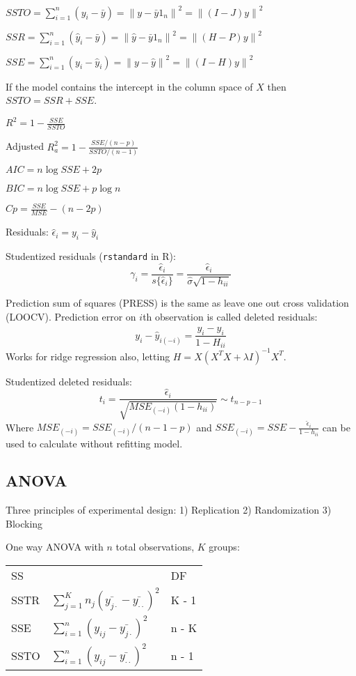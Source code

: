 \documentclass[10pt, twocolumn]{article}
\newcommand{\norm}[1]{\left\lVert#1\right\rVert}
\begin{document}
$SSTO = \sum_{i=1}^n (y_i - \bar{y}) = \norm{y - \bar{y} 1_n }^2
        = \norm{(I - J)y}^2$

$SSR = \sum_{i=1}^n (\hat{y}_i - \bar{y}) = \norm{\hat{y} - \bar{y} 1_n}^2
    = \norm{(H - P)y}^2$

$SSE = \sum_{i=1}^n (y_i - \hat{y}_i) = \norm{y - \hat{y}}^2
        = \norm{(I - H)y}^2$

If the model contains the intercept in the column space of $X$  then $SSTO = SSR + SSE$.

$R^2 = 1 - \frac{SSE}{SSTO}$

Adjusted $R^2_a = 1 - \frac{SSE / (n-p)}{SSTO / (n-1)}$

$AIC = n \log SSE + 2p$

$BIC = n \log SSE + p \log n$

$Cp = \frac{SSE}{MSE} - (n - 2p)$

Residuals: $\hat{\epsilon}_i = y_i - \hat{y}_i$

Studentized residuals (\texttt{rstandard} in R): 
\[
    \gamma_i =
    \frac{\hat{\epsilon}_i}{ s \{ \hat{\epsilon}_i \} } = 
    \frac{\hat{\epsilon}_i}{\hat{\sigma} \sqrt{1 - h_{ii}}}
\]

Prediction sum of squares (PRESS) is the same as leave one out cross
validation (LOOCV). Prediction error on $i$th observation is called deleted
residuals:
\[
    y_i - \hat{y}_{i (-i)} = \frac{y_i - \hat{y}_i}{1 - H_{ii}}
\]
Works for ridge regression also, letting 
$H = X(X^T X + \lambda I)^{-1} X^T$.

Studentized deleted residuals: 
\[
    t_i = \frac{\hat{\epsilon}_i}{\sqrt{MSE_{(-i)} (1 - h_{ii})}} \sim t_{n - p -1}
\]
Where $MSE_{(-i)} = SSE_{(-i)} / (n - 1 - p)$ and
$SSE_{(-i)} = SSE - \frac{\hat{\epsilon}_i}{1 - h_{ii}}$ can be used to
calculate without refitting model.

\subsection*{ANOVA}

Three principles of experimental design: 1) Replication 2) Randomization 3)
Blocking

One way ANOVA with $n$ total observations, $K$ groups:

{
\centering
\begin{tabular}{lll}
    SS   &  & DF     \\
    SSTR & $\sum_{j=1}^K n_j (\bar{y_{j \cdot}} - \bar{y_{\cdot \cdot}})^2$  & K - 1 \\
    SSE  & $\sum_{i=1}^n (y_{ij} - \bar{y_{j \cdot}})^2$  & n - K \\
    SSTO & $\sum_{i=1}^n (y_{ij} - \bar{y_{\cdot \cdot}})^2$  & n - 1 
\end{tabular}
}
\end{document}
